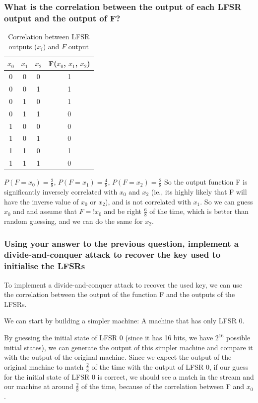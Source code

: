 \documentclass{article}
\begin{document}
\subsubsection{What is the correlation between the output of each LFSR output and the output of F?}
\begin{table}
    \begin{center}
        \begin{tabular}[c]{ccc|c}
            \textbf{$x_0$} & \textbf{$x_1$} & \textbf{$x_2$} & \textbf{F($x_0$, $x_1$, $x_2$)} \\
            \hline
            0 & 0 & 0 & 1 \\ 
            0 & 0 & 1 & 1 \\
            0 & 1 & 0 & 1 \\
            0 & 1 & 1 & 0 \\
            1 & 0 & 0 & 0 \\
            1 & 0 & 1 & 0 \\
            1 & 1 & 0 & 1 \\
            1 & 1 & 1 & 0 \\
        \end{tabular}
    \end{center}
    \caption{Correlation between LFSR outputs ($x_i$) and $F$ output}\label{tab:}
\end{table}
$P(F=x_0) = \frac{2}{8}$, $P(F=x_1) = \frac{4}{8}$, $P(F=x_2) = \frac{2}{8}$
So the output function F is significantly inversely correlated with $x_0$ and $x_2$ (ie., its highly likely that F will have the inverse value of $x_0$ or $x_2$), and is not correlated with $x_1$. So we can guess $x_0$ and and assume that $F = !x_0$ and be right $\frac{6}{8}$ of the time, which is better than random guessing, and we can do the same for $x_2$.

\subsubsection{Using your answer to the previous question, implement a divide-and-conquer attack to recover the key used to initialise the LFSRs}
To implement a divide-and-conquer attack to recover the used key, we can use the correlation between the output of the function F and the outputs of the LFSRs.

We can start by building a simpler machine: A machine that has only LFSR 0.

By guessing the initial state of LFSR 0 (since it has 16 bits, we have $2^{16}$ possible initial states), we can generate the output of this simpler machine and compare it with the output of the original machine. 
Since we expect the output of the original machine to match $\frac{2}{8}$ of the time with the output of LFSR 0, if our guess for the initial state of LFSR 0 is correct, we should see a match in the stream and our machine at around $\frac{2}{8}$ of the time, because of the correlation between F and $x_0$.
\end{document}
